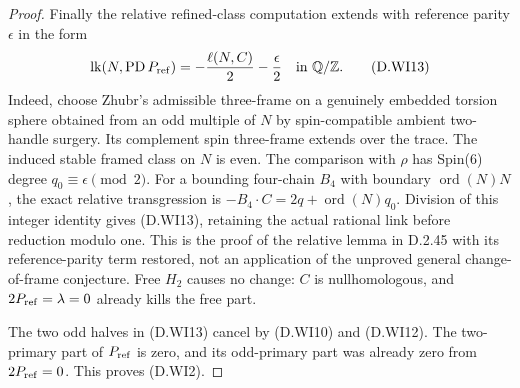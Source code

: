 \begin{proof}
Finally the relative refined-class computation extends with
reference parity $\epsilon$ in the form
\[
 \operatorname{lk}(N,\operatorname{PD}P_{\rm ref})
                 =-\frac{\ell(N,C)}2-\frac{\epsilon}2
                                      \quad\text{in }\mathbb Q/\mathbb Z .
 \tag{D.WI13}
\]
Indeed, choose Zhubr's admissible three-frame on a genuinely
embedded torsion sphere obtained from an odd multiple of $N$
by spin-compatible ambient two-handle surgery.  Its complement
spin three-frame extends over the trace.  The induced stable
framed class on $N$ is even.  The comparison with $\rho$ has
Spin(6) degree $q_0\equiv\epsilon\pmod2$.
For a bounding four-chain $B_4$ with boundary
$\operatorname{ord}(N)N$, the exact relative transgression is
$-B_4\cdot C=2q+\operatorname{ord}(N)q_0$.
Division of this integer identity gives (D.WI13), retaining
the actual rational link before reduction modulo one.
This is the proof of the relative lemma in D.2.45 with its
reference-parity term restored, not an application of the
unproved general change-of-frame conjecture.
Free $H_2$ causes no change: $C$ is nullhomologous, and
$2P_{\rm ref}=\lambda=0$ already kills the free part.

The two odd halves in (D.WI13) cancel by (D.WI10) and
(D.WI12).  The two-primary part of $P_{\rm ref}$ is zero,
and its odd-primary part was already zero from
$2P_{\rm ref}=0$.  This proves (D.WI2).
\end{proof}
